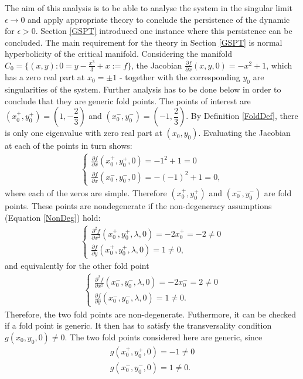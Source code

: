 The aim of this analysis is to be able to analyse the system in the singular limit $\epsilon \to 0$ and apply appropriate theory to conclude the persistence of the dynamic for $\epsilon > 0$. 
Section \ref{GSPT} introduced one instance where this persistence can be concluded.
The main requirement for the theory in Section \ref{GSPT} is normal hyperbolicity of the critical manifold.
Considering the manifold $C_0= \{ (x,y) : 0=y-\frac{x^3}{3}+x:=f \}$, the Jacobian $\frac{ \partial f}{\partial x}(x,y,0) = -x^2 + 1$, which has a zero real part at $x_0= \pm 1$ - together with the corresponding $y_0$ are singularities of the system.
Further analysis has to be done below in order to conclude that they are generic fold points.
The points of interest are $(x_0^+,y_0^+)=(1,-\dfrac{2}{3})$ and $(x_0^-,y_0^-)=(-1,\dfrac{2}{3})$. By Definition \ref{FoldDef}, there is only one eigenvalue with zero real part at $(x_0,y_0)$. Evaluating the Jacobian at each of the points in turn shows:
\begin{align*}
\begin{cases}
\frac{ \partial f}{\partial x}(x_0^+,y_0^+,0) = -1^2 + 1 =0 \\
\frac{ \partial f}{\partial x}(x_0^-,y_0^-,0) = -(-1)^2 + 1 =0,
\end{cases}
\end{align*}
where each of the zeros are simple.
Therefore $(x_0^+,y_0^+)$ and $(x_0^-,y_0^-)$ are fold points.
These points are nondegenerate if the non-degeneracy assumptions (Equation \ref{NonDeg}) hold:
\begin{align*}
\begin{cases}
\frac{ \partial ^2 f}{ \partial x^2} (x_0^+,y_0^+, \lambda, 0) = -2 x_0^+ = -2 \neq 0 \\
\frac{\partial f}{\partial y}(x_0^+,y_0^+, \lambda, 0) = 1 \neq 0,
\end{cases}
\end{align*}
and equivalently for the other fold point
\begin{align*}
\begin{cases}
\frac{ \partial ^2 f}{ \partial x^2} (x_0^-,y_0^-, \lambda, 0) = -2 x_0^- = 2 \neq 0 \\
\frac{\partial f}{\partial y}(x_0^-,y_0^-, \lambda, 0) = 1 \neq 0.
\end{cases}
\end{align*}
Therefore, the two fold points are non-degenerate.
Futhermore, it can be checked if a fold point is generic. It then has to satisfy the transversality condition $g(x_0,y_0,0) \neq 0$.
The two fold points considered here are generic, since 
\begin{align*}
g(x_0^+,y_0^+,0)= -1 \neq 0 \\
g(x_0^-,y_0^-,0)= 1 \neq 0.
\end{align*}

